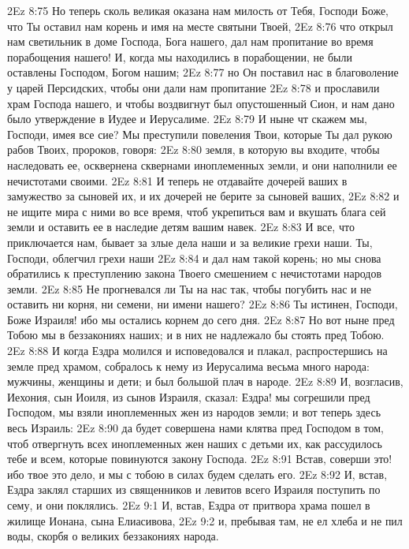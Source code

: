\vs 2Ez 8:75 Но теперь сколь великая оказана нам милость от Тебя, Господи Боже, что Ты оставил нам корень и имя на месте святыни Твоей,
\vs 2Ez 8:76 что открыл нам светильник в доме Господа, Бога нашего, дал нам пропитание во время порабощения нашего! И, когда мы находились в порабощении, не были оставлены Господом, Богом нашим;
\vs 2Ez 8:77 но Он поставил нас в благоволение у царей Персидских, чтобы они дали нам пропитание
\vs 2Ez 8:78 и прославили храм Господа нашего, и чтобы воздвигнут был опустошенный Сион, и нам дано было утверждение в Иудее и Иерусалиме.
\vs 2Ez 8:79 И ныне чт скажем мы, Господи, имея все сие? Мы преступили повеления Твои, которые Ты дал рукою рабов Твоих, пророков, говоря:
\vs 2Ez 8:80 земля, в которую вы входите, чтобы наследовать ее, осквернена сквернами иноплеменных земли, и они наполнили ее нечистотами своими.
\vs 2Ez 8:81 И теперь не отдавайте дочерей ваших в замужество за сыновей их, и их дочерей не берите за сыновей ваших,
\vs 2Ez 8:82 и не ищите мира с ними во все время, чтоб укрепиться вам и вкушать блага сей земли и оставить ее в наследие детям вашим навек.
\vs 2Ez 8:83 И все, что приключается нам, бывает за злые дела наши и за великие грехи наши. Ты, Господи, облегчил грехи наши
\vs 2Ez 8:84 и дал нам такой корень; но мы снова обратились к преступлению закона Твоего смешением с нечистотами народов земли.
\vs 2Ez 8:85 Не прогневался ли Ты на нас так, чтобы погубить нас и не оставить ни корня, ни семени, ни имени нашего?
\vs 2Ez 8:86 Ты истинен, Господи, Боже Израиля! ибо мы остались корнем до сего дня.
\vs 2Ez 8:87 Но вот ныне пред Тобою мы в беззакониях наших; и в них не надлежало бы стоять пред Тобою.
\rsbpar\vs 2Ez 8:88 И когда Ездра молился и исповедовался и плакал, распростершись на земле пред храмом, собралось к нему из Иерусалима весьма много народа: мужчины, женщины и дети; и был большой плач в народе.
\vs 2Ez 8:89 И, возгласив, Иехония, сын Иоиля, из сынов Израиля, сказал: Ездра! мы согрешили пред Господом, мы взяли иноплеменных жен из народов земли; и вот теперь здесь весь Израиль:
\vs 2Ez 8:90 да будет совершена нами клятва пред Господом в том, чтоб отвергнуть всех иноплеменных жен наших с детьми их, как рассудилось тебе и всем, которые повинуются закону Господа.
\vs 2Ez 8:91 Встав, соверши это! ибо твое это дело, и мы с тобою в силах будем сделать его.
\vs 2Ez 8:92 И, встав, Ездра заклял старших из священников и левитов всего Израиля поступить по сему, и они поклялись.
\vs 2Ez 9:1 И, встав, Ездра от притвора храма пошел в жилище Ионана, сына Елиасивова,
\vs 2Ez 9:2 и, пребывая там, не ел хлеба и не пил воды, скорбя о великих беззакониях народа.

